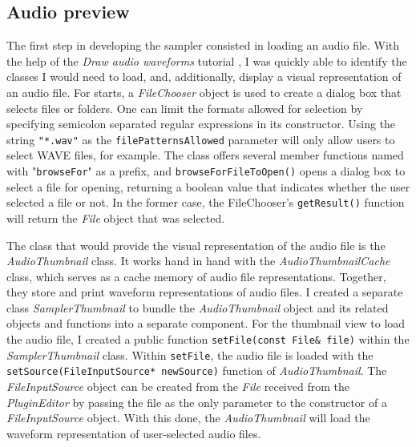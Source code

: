 \documentclass[12pt, a4paper, hidelinks]{article}
\begin{document}
	\subsection{Audio preview}	
	The first step in developing the sampler consisted in loading an audio file. With the help of the \textit{Draw audio waveforms} tutorial \cite{audiothumbnail}, I was quickly able to identify the classes I would need to load, and, additionally, display a visual representation of an audio file. For starts, a \textit{FileChooser} object is used to create a dialog box that selects files or folders. One can limit the formats allowed for selection by specifying semicolon separated regular expressions in its constructor. Using the string \texttt{"*.wav"} as the \texttt{filePatternsAllowed} parameter will only allow users to select WAVE files, for example. The class offers several member functions named with "\texttt{browseFor}" as a prefix, and \texttt{browseForFileToOpen()} opens a dialog box to select a file for opening, returning a boolean value that indicates whether the user selected a file or not. In the former case, the FileChooser's \texttt{getResult()} function will return the \textit{File} object that was selected. \par
	The class that would provide the visual representation of the audio file is the \textit{AudioThumbnail} class. It works hand in hand with the \textit{AudioThumbnailCache} class, which serves as a cache memory of audio file representations. Together, they store and print waveform representations of audio files. I created a separate class \textit{SamplerThumbnail} to bundle the \textit{AudioThumbnail} object and its related objects and functions into a separate component. For the thumbnail view to load the audio file, I created a public function \texttt{setFile(const File\& file)} within the \textit{SamplerThumbnail} class. Within \texttt{setFile}, the audio file is loaded with the \texttt{setSource(FileInputSource* newSource)} function of \textit{AudioThumbnail}. The \textit{FileInputSource} object can be created from the \textit{File} received from the \textit{PluginEditor} by passing the file as the only parameter to the constructor of a \textit{FileInputSource} object. With this done, the \textit{AudioThumbnail} will load the waveform representation of user-selected audio files.\par
	
\end{document}
